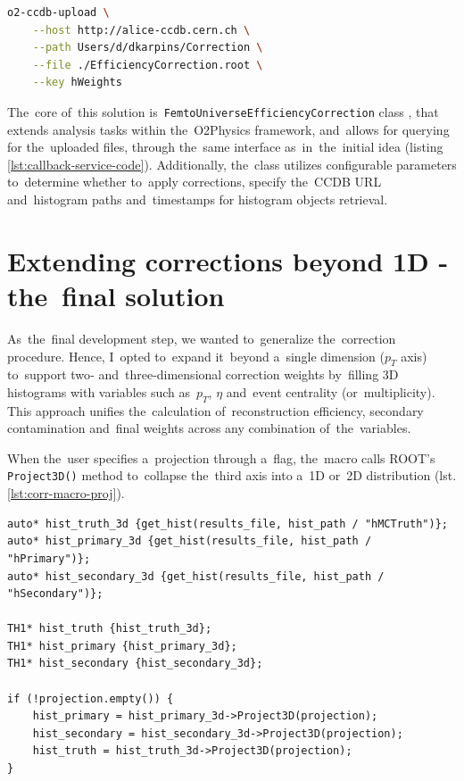 \documentclass[11pt,a4paper,twoside]{book}
\numberwithin{equation}{chapter}
\begin{document}
\begin{lstlisting}[language={bash},caption={\label{lst:ccdb-upload-cmd} Example command for the CCDB upload.}]
o2-ccdb-upload \
    --host http://alice-ccdb.cern.ch \
    --path Users/d/dkarpins/Correction \
    --file ./EfficiencyCorrection.root \
    --key hWeights
\end{lstlisting}

The core of this solution is \verb|FemtoUniverseEfficiencyCorrection| class \cite{efficiency-correction-class}, that extends analysis tasks within the O2Physics framework, and allows for querying for the uploaded files, through the same interface as in the initial idea (listing \ref{lst:callback-service-code}). Additionally, the class utilizes configurable parameters to determine whether to apply corrections, specify the CCDB URL and histogram paths and timestamps for histogram objects retrieval.

\section{Extending corrections beyond 1D - the final solution}

As the final development step, we wanted to generalize the correction procedure. Hence, I opted to expand it beyond a single dimension ($p_{T}$ axis) to support two‐ and three‐dimensional correction weights by filling 3D histograms with variables such as $p_{T}$, $\eta$ and event centrality (or multiplicity). This approach unifies the calculation of reconstruction efficiency, secondary contamination and final weights across any combination of the variables.

When the user specifies a projection through a flag, the macro calls ROOT's \verb|Project3D()| method to collapse the third axis into a 1D or 2D distribution (lst. \ref{lst:corr-macro-proj}).

\begin{lstlisting}[caption={\label{lst:corr-macro-proj} Snippet of the correction macro - projection.}]
auto* hist_truth_3d {get_hist(results_file, hist_path / "hMCTruth")};
auto* hist_primary_3d {get_hist(results_file, hist_path / "hPrimary")};
auto* hist_secondary_3d {get_hist(results_file, hist_path / "hSecondary")};

TH1* hist_truth {hist_truth_3d};
TH1* hist_primary {hist_primary_3d};
TH1* hist_secondary {hist_secondary_3d};

if (!projection.empty()) {
    hist_primary = hist_primary_3d->Project3D(projection);
    hist_secondary = hist_secondary_3d->Project3D(projection);
    hist_truth = hist_truth_3d->Project3D(projection);
}
\end{lstlisting}
\end{document}
